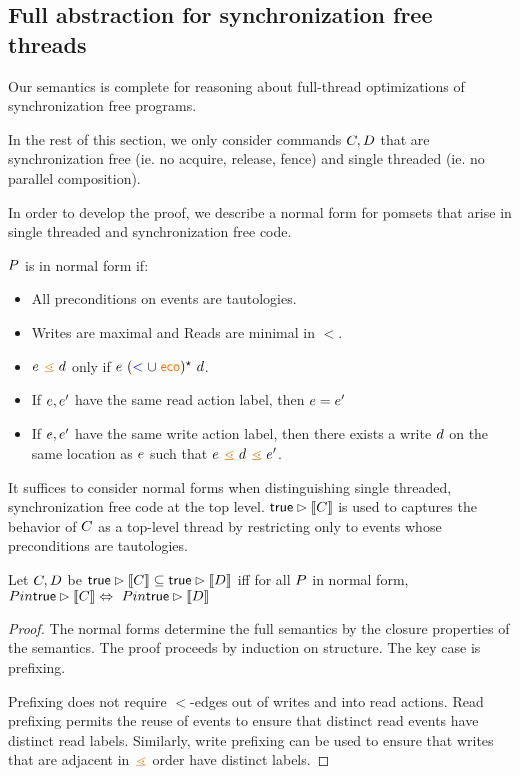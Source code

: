 \subsection{Full abstraction for synchronization free threads}
Our semantics is complete for reasoning about full-thread optimizations of synchronization free programs.

In the rest of this section, we only consider commands $C,D$ that are synchronization free (ie. no acquire, release, fence) and single threaded (ie. no parallel composition). 

In order to develop the proof, we describe a normal form for pomsets that arise in single threaded and synchronization free code.  
\begin{definition}
$P$ is in normal form if:
\begin{itemize}
\item All preconditions on events are tautologies.
\item Writes are maximal and Reads are minimal in $\lt$.
\item $\aEv \gtN \bEv$ only if $ \aEv\ (\lt \cup \reco)^{\star} \  \bEv$.
\item If $e, e'$ have the same read action label, then $e = e'$
\item  If $e, e'$ have the same write action label, then there exists a write $d$ on the same location as $e$ such that $\aEv \gtN \bEv \gtN \aEv'$.
\end{itemize}
\end{definition}
It suffices to consider normal forms when distinguishing single threaded, synchronization free code at the top level. $\mathsf{true}\mathbin\rhd \llbracket C\rrbracket$ is used to captures the behavior of $C$ as a top-level thread by restricting only to events whose preconditions are tautologies.
\begin{lemma}\label{unrhd}
Let $C,D$ be 
$\mathsf{true}\mathbin\rhd \llbracket C\rrbracket \subseteq \mathsf{true}\mathbin\rhd \llbracket D\rrbracket $  iff for all $P$ in normal form, $P in \mathsf{true}\mathbin\rhd \llbracket C\rrbracket \Leftrightarrow\ P in \mathsf{true}\mathbin\rhd \llbracket D\rrbracket$
\begin{proof}
The normal forms determine the full semantics by the closure properties of the semantics.     The proof proceeds by induction on structure.  The key case is prefixing. 

Prefixing does not require $\lt$-edges out of writes  and into read actions.  Read prefixing permits the reuse of events to ensure that distinct read events have distinct read labels.  Similarly, write prefixing can be used to ensure that  writes that are adjacent in $\gtN$ order have distinct labels.
\end{proof}
\end{lemma}



